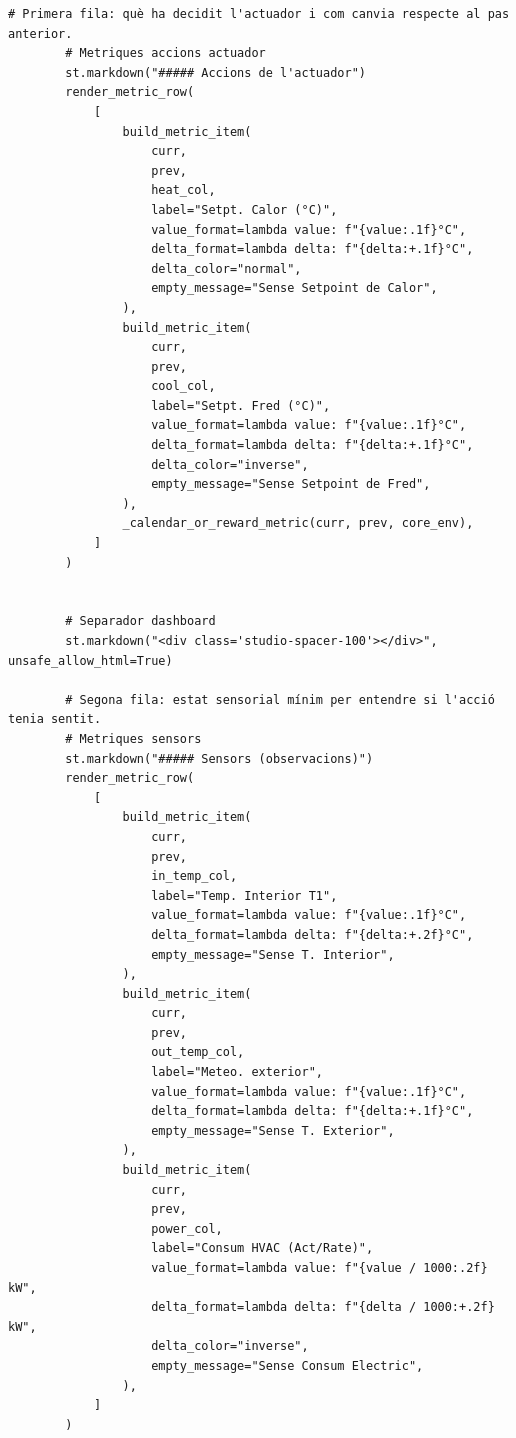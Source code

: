 \documentclass[10pt,a4paper]{article}
\begin{document}
\begin{lstlisting}[style=studioPython,caption={pages/Interaccionar\_amb\_l'Agent.py},label={lst:pages-interaccionar-amb-l-agent-py}]
        # Primera fila: què ha decidit l'actuador i com canvia respecte al pas anterior.
        # Metriques accions actuador
        st.markdown("##### Accions de l'actuador")
        render_metric_row(
            [
                build_metric_item(
                    curr,
                    prev,
                    heat_col,
                    label="Setpt. Calor (°C)",
                    value_format=lambda value: f"{value:.1f}°C",
                    delta_format=lambda delta: f"{delta:+.1f}°C",
                    delta_color="normal",
                    empty_message="Sense Setpoint de Calor",
                ),
                build_metric_item(
                    curr,
                    prev,
                    cool_col,
                    label="Setpt. Fred (°C)",
                    value_format=lambda value: f"{value:.1f}°C",
                    delta_format=lambda delta: f"{delta:+.1f}°C",
                    delta_color="inverse",
                    empty_message="Sense Setpoint de Fred",
                ),
                _calendar_or_reward_metric(curr, prev, core_env),
            ]
        )


        # Separador dashboard
        st.markdown("<div class='studio-spacer-100'></div>", unsafe_allow_html=True)

        # Segona fila: estat sensorial mínim per entendre si l'acció tenia sentit.
        # Metriques sensors
        st.markdown("##### Sensors (observacions)")
        render_metric_row(
            [
                build_metric_item(
                    curr,
                    prev,
                    in_temp_col,
                    label="Temp. Interior T1",
                    value_format=lambda value: f"{value:.1f}°C",
                    delta_format=lambda delta: f"{delta:+.2f}°C",
                    empty_message="Sense T. Interior",
                ),
                build_metric_item(
                    curr,
                    prev,
                    out_temp_col,
                    label="Meteo. exterior",
                    value_format=lambda value: f"{value:.1f}°C",
                    delta_format=lambda delta: f"{delta:+.1f}°C",
                    empty_message="Sense T. Exterior",
                ),
                build_metric_item(
                    curr,
                    prev,
                    power_col,
                    label="Consum HVAC (Act/Rate)",
                    value_format=lambda value: f"{value / 1000:.2f} kW",
                    delta_format=lambda delta: f"{delta / 1000:+.2f} kW",
                    delta_color="inverse",
                    empty_message="Sense Consum Electric",
                ),
            ]
        )



\end{lstlisting}
\end{document}
